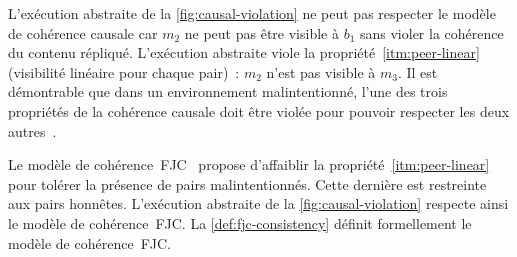 L'exécution abstraite de la \autoref{fig:causal-violation} ne peut pas respecter le modèle de cohérence causale car $m_2$ ne peut pas être visible à $b_1$ sans violer la cohérence du contenu répliqué.
L'exécution abstraite viole la propriété~\ref{itm:peer-linear} (visibilité linéaire pour chaque pair)~: $m_2$ n'est pas visible à $m_3$.
Il est démontrable que dans un environnement malintentionné, l'une des trois propriétés de la cohérence causale doit être violée pour pouvoir respecter les deux autres~\autocite{mahajan_2011_cac}.

Le modèle de cohérence~\acf{FJC}~\autocite{mahajan_2011_cac,mahajan_astro_2008} propose d'affaiblir la propriété~\ref{itm:peer-linear} pour tolérer la présence de pairs malintentionnés.
Cette dernière est restreinte aux pairs honnêtes.
L'exécution abstraite de la \autoref{fig:causal-violation} respecte ainsi le modèle de cohérence~\ac{FJC}.
La \autoref{def:fjc-consistency} définit formellement le modèle de cohérence~\ac{FJC}.

